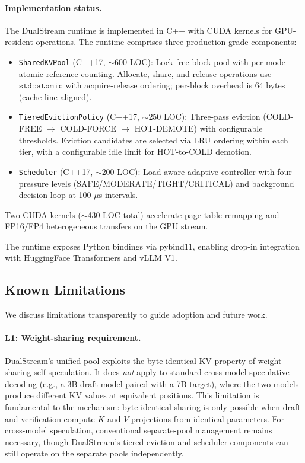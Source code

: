 \documentclass[review]{elsarticle}
\theoremstyle{definition}
\theoremstyle{remark}
\begin{document}
\paragraph{Implementation status.}
\label{sec:limitations}
The DualStream runtime is implemented in C++ with CUDA kernels for
GPU-resident operations. The runtime comprises three production-grade
components:
\begin{itemize}
    \item \texttt{SharedKVPool} (C++17, $\sim$600 LOC): Lock-free block pool
    with per-mode atomic reference counting. Allocate, share, and release
    operations use $\texttt{std::atomic}$ with acquire-release ordering;
    per-block overhead is 64 bytes (cache-line aligned).
    \item \texttt{TieredEvictionPolicy} (C++17, $\sim$250 LOC): Three-pass
    eviction (COLD-FREE $\to$ COLD-FORCE $\to$ HOT-DEMOTE) with configurable
    thresholds. Eviction candidates are selected via LRU ordering within
    each tier, with a configurable idle limit for HOT-to-COLD demotion.
    \item \texttt{Scheduler} (C++17, $\sim$200 LOC): Load-aware adaptive
    controller with four pressure levels (SAFE/MODERATE/TIGHT/CRITICAL)
    and background decision loop at 100 $\mu$s intervals.
\end{itemize}
Two CUDA kernels ($\sim$430 LOC total) accelerate page-table remapping
and FP16/FP4 heterogeneous transfers on the GPU stream.

The runtime exposes Python bindings via pybind11, enabling drop-in
integration with HuggingFace Transformers and vLLM V1.

\subsection{Known Limitations}
\label{sec:limitations-detail}

We discuss limitations transparently to guide adoption and future work.

\paragraph{L1: Weight-sharing requirement.}
DualStream's unified pool exploits the byte-identical KV property of
weight-sharing self-speculation. It does \emph{not} apply to standard
cross-model speculative decoding (e.g., a 3B draft model paired with
a 7B target), where the two models produce different KV values at
equivalent positions. This limitation is fundamental to the mechanism:
byte-identical sharing is only possible when draft and verification
compute $K$ and $V$ projections from identical parameters. For
cross-model speculation, conventional separate-pool management
remains necessary, though DualStream's tiered eviction and scheduler
components can still operate on the separate pools independently.
\end{document}
